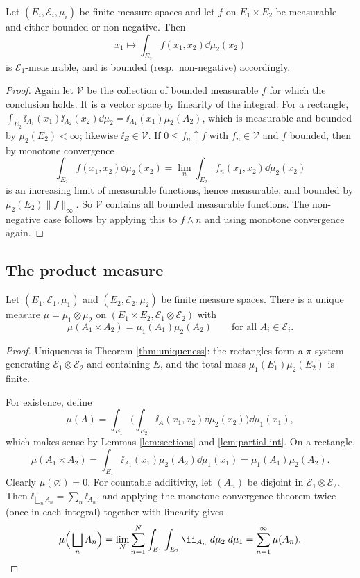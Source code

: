 \documentclass[a4paper]{scrartcl}
\newcommand{\cE}{\mathcal{E}}
\newcommand{\cV}{\mathcal{V}}
\newcommand{\ind}{\ii}
\begin{document}
\begin{lemma}\label{lem:partial-int}
	Let $(E_i,\cE_i,\mu_i)$ be finite measure spaces and let $f$ on $E_1\times E_2$ be measurable and either bounded or non-negative. Then
	$$
	x_1 \longmapsto \int_{E_2} f(x_1,x_2)\dd\mu_2(x_2)
	$$
	is $\cE_1$-measurable, and is bounded (resp.\ non-negative) accordingly.
\end{lemma}
\begin{proof}
	Again let $\cV$ be the collection of bounded measurable $f$ for which the conclusion holds. It is a vector space by linearity of the integral. For a rectangle, $\int_{E_2}\ind_{A_1}(x_1)\ind_{A_2}(x_2)\dd\mu_2 = \ind_{A_1}(x_1)\mu_2(A_2)$, which is measurable and bounded by $\mu_2(E_2)<\infty$; likewise $\ind_E \in \cV$. If $0 \leq f_n \uparrow f$ with $f_n \in \cV$ and $f$ bounded, then by monotone convergence
	$$
	\int_{E_2} f(x_1,x_2)\dd\mu_2(x_2) = \lim_n \int_{E_2} f_n(x_1,x_2)\dd\mu_2(x_2)
	$$
	is an increasing limit of measurable functions, hence measurable, and bounded by $\mu_2(E_2)\|f\|_\infty$. So $\cV$ contains all bounded measurable functions. The non-negative case follows by applying this to $f \wedge n$ and using monotone convergence again.
\end{proof}

\subsection{The product measure}

\begin{theorem}\label{thm:product}
	Let $(E_1,\cE_1,\mu_1)$ and $(E_2,\cE_2,\mu_2)$ be finite measure spaces. There is a unique measure $\mu = \mu_1\otimes\mu_2$ on $(E_1\times E_2, \cE_1\otimes\cE_2)$ with
	$$
	\mu(A_1\times A_2) = \mu_1(A_1)\mu_2(A_2) \qquad \text{for all } A_i \in \cE_i.
	$$
\end{theorem}
\begin{proof}
	Uniqueness is Theorem \ref{thm:uniqueness}: the rectangles form a $\pi$-system generating $\cE_1\otimes\cE_2$ and containing $E$, and the total mass $\mu_1(E_1)\mu_2(E_2)$ is finite.

	For existence, define
	$$
	\mu(A) = \int_{E_1}\Big( \int_{E_2}\ind_A(x_1,x_2)\dd\mu_2(x_2)\Big)\dd\mu_1(x_1),
	$$
	which makes sense by Lemmas \ref{lem:sections} and \ref{lem:partial-int}. On a rectangle,
	$$
	\mu(A_1\times A_2) = \int_{E_1}\ind_{A_1}(x_1)\mu_2(A_2)\dd\mu_1(x_1) = \mu_1(A_1)\mu_2(A_2).
	$$
	Clearly $\mu(\varnothing) = 0$. For countable additivity, let $(A_n)$ be disjoint in $\cE_1\otimes\cE_2$. Then $\ind_{\bigsqcup_n A_n} = \sum_n \ind_{A_n}$, and applying the monotone convergence theorem twice (once in each integral) together with linearity gives
	$$
	\mu\Big(\bigsqcup_n A_n\Big) = \lim_{N}\sum_{n=1}^N \int_{E_1}\int_{E_2}\ind_{A_n}\dd\mu_2\dd\mu_1 = \sum_{n=1}^\infty \mu(A_n). \qedhere
	$$
\end{proof}
\end{document}
